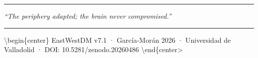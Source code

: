 \documentclass[
  letterpaper,
  DIV=11,
  numbers=noendperiod]{scrartcl}
\begin{document}
\begin{center}\rule{0.5\linewidth}{0.5pt}\end{center}

\emph{``The periphery adapted; the brain never compromised.''}

\begin{center}\rule{0.5\linewidth}{0.5pt}\end{center}

\vspace{0.5cm}

\textbackslash begin\{center\}
\textcolor[HTML]{666666}{\small EastWestDM v7.1 · García-Morán 2026 · Universidad de Valladolid · DOI: 10.5281/zenodo.20260486}
\textbackslash end\{center\textgreater{}
\end{document}
